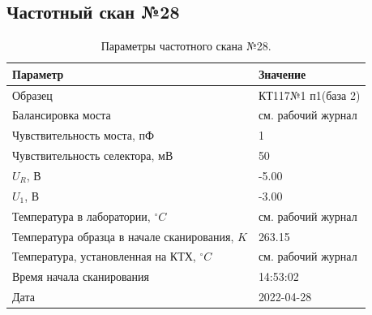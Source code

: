 \subsection{Частотный скан №28}
\begin{table}[!ht]
    \centering
    \caption{Параметры частотного скана №28.}
    \begin{tabular}{|l|l|}
        \hline
        Параметр                                       & Значение                  \\ \hline
        Образец                                        & КТ117№1 п1(база 2)        \\ \hline
        Балансировка моста                             & см. рабочий журнал        \\ \hline
        Чувствительность моста, пФ                     & 1                         \\ \hline
        Чувствительность селектора, мВ                 & 50                        \\ \hline
        $U_R$, В                                       & -5.00                     \\ \hline
        $U_1$, В                                       & -3.00                     \\ \hline
        Температура в лаборатории, $^\circ C$          & см. рабочий журнал        \\ \hline
        Температура образца в начале сканирования, $K$ & 263.15                    \\ \hline
        Температура, установленная на КТХ, $^\circ C$  & см. рабочий журнал        \\ \hline
        Время начала сканирования                      & 14:53:02                  \\ \hline
        Дата                                           & 2022-04-28                \\ \hline
    \end{tabular}
    \label{table:frequency_scan_28}
\end{table}

